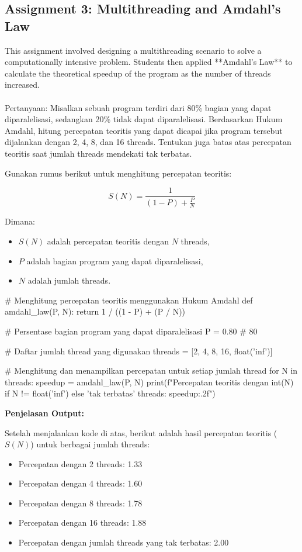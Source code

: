 \subsection{Assignment 3: Multithreading and Amdahl's Law}
This assignment involved designing a multithreading scenario to solve a computationally intensive problem. Students then applied **Amdahl's Law** to calculate the theoretical speedup of the program as the number of threads increased.\\
\\
Pertanyaan:
Misalkan sebuah program terdiri dari 80\% bagian yang dapat diparalelisasi, sedangkan 20\% tidak dapat diparalelisasi. Berdasarkan Hukum Amdahl, hitung percepatan teoritis yang dapat dicapai jika program tersebut dijalankan dengan 2, 4, 8, dan 16 threads. Tentukan juga batas atas percepatan teoritis saat jumlah threads mendekati tak terbatas.

Gunakan rumus berikut untuk menghitung percepatan teoritis:

\[
S(N) = \frac{1}{(1 - P) + \frac{P}{N}}
\]

Dimana:
\begin{itemize}
    \item \( S(N) \) adalah percepatan teoritis dengan \( N \) threads,
    \item \( P \) adalah bagian program yang dapat diparalelisasi,
    \item \( N \) adalah jumlah threads.
\end{itemize}

\begin{python}
    # Menghitung percepatan teoritis menggunakan Hukum Amdahl
def amdahl_law(P, N):
    return 1 / ((1 - P) + (P / N))

# Persentase bagian program yang dapat diparalelisasi
P = 0.80  # 80%

# Daftar jumlah thread yang digunakan
threads = [2, 4, 8, 16, float('inf')]

# Menghitung dan menampilkan percepatan untuk setiap jumlah thread
for N in threads:
    speedup = amdahl_law(P, N)
    print(f"Percepatan teoritis dengan {int(N) if N != float('inf') else 'tak terbatas'} threads: {speedup:.2f}")
\end{python}

\textbf{Penjelasan Output:}

Setelah menjalankan kode di atas, berikut adalah hasil percepatan teoritis (\(S(N)\)) untuk berbagai jumlah threads:

\begin{itemize}
    \item Percepatan dengan 2 threads: 1.33
    \item Percepatan dengan 4 threads: 1.60
    \item Percepatan dengan 8 threads: 1.78
    \item Percepatan dengan 16 threads: 1.88
    \item Percepatan dengan jumlah threads yang tak terbatas: 2.00
\end{itemize}

